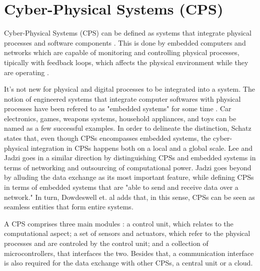 \section{Cyber-Physical Systems (CPS)}  \label{sec:bgCPS}

Cyber-Physical Systems (CPS) can be defined as systems that integrate physical processes and software components \cite{lee2008cyber}. This is done by embedded computers and networks which are capable of monitoring and controlling physical processes, tipically with feedback loops, which affects the physical environment while they are operating \cite{banerjee2011ensuring}.


It's not new for physical and digital processes to be integrated into a system. The notion of engineered systems that integrate computer softwares with physical processes have been refered to as "embedded systems" for some time \cite{lee2008cyber}. Car electronics, games, weapons systems, household appliances, and toys can be named as a few successful examples. In order to delineate the distinction, Schatz \cite{schatz2014role} states that, even though CPSs encompasses embedded systems, the cyber-physical integration in CPSs happens both on a local and a global scale. Lee \cite{lee2008cyber} and Jadzi \cite{jazdi2014cyber} goes in a similar direction by distinguishing CPSs and embedded systems in terms of networking and outsourcing of computational power. Jadzi \cite{jazdi2014cyber} goes beyond by alluding the data exchange as its most important feature, while defining CPSs in terms of embedded systems that are "able to send and receive data over a network." In turn, Dowdeswell et. al \cite{dowdeswell2020finding} adds that, in this sense, CPSs can be seen as seamless entities that form entire systems.

A CPS comprises three main modules \cite{jazdi2014cyber}: a control unit, which relates to the computational aspect; a set of sensors and actuators, which refer to the physical processes and are controled by the control unit; and a collection of microcontrollers, that interfaces the two. Besides that, a communication interface is also required for the data exchange with other CPSs, a central unit or a cloud. 

